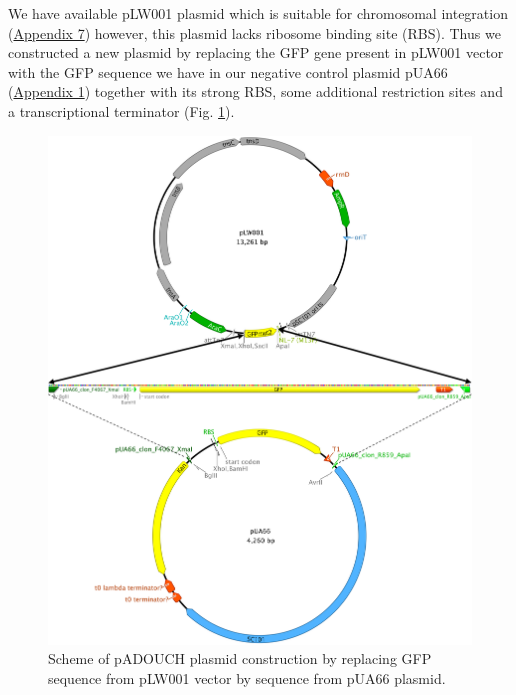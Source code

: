 We have available pLW001 plasmid which is suitable for chromosomal integration (\hyperlink{pLW001}{Appendix 7}) however, this plasmid lacks ribosome binding site (RBS).
Thus we constructed a new plasmid by replacing the GFP gene present in pLW001 vector with the GFP sequence we have in our negative control plasmid pUA66 (\hyperlink{pUA66seq}{Appendix 1}) together with its strong RBS, some additional restriction sites and a transcriptional terminator (Fig. \ref{cloning}).
\begin{figure}[ht!]
  \centering
  \includegraphics[scale=0.37]{text/Pictures/Cloning.png}
	\caption{Scheme of pADOUCH plasmid construction by replacing GFP sequence from pLW001 vector by sequence from pUA66 plasmid.}
	\label{cloning}
\end{figure}

